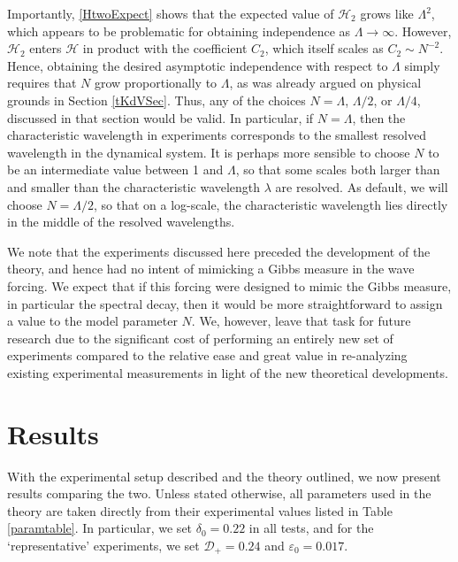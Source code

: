 \documentclass[11pt]{article}
\newcommand{\eps}{\varepsilon}
\newcommand{\lam}{\lambda}
\newcommand{\lamfac}{N}
\newcommand{\drat}{\mathcal{D}}
\newcommand{\dratdn}{\drat_+}
\newcommand{\epsup}{\eps_0}
\newcommand{\delup}{\delta_0}
\newcommand{\Ham}{\mathcal{H}}
\newcommand{\Htwo}{\Ham_{2}}
\begin{document}
	Importantly, \eqref{HtwoExpect} shows that the expected value of $\Htwo$ grows like $\Lambda^2$, which appears to be problematic for obtaining independence as $\Lambda \to \infty$. However, $\Htwo$ enters $\Ham$ in product with the coefficient $C_2$, which itself scales as $C_2 \sim \lamfac^{-2}$. Hence, obtaining the desired asymptotic independence with respect to $\Lambda$ simply requires that $\lamfac$ grow proportionally to $\Lambda$, as was already argued on physical grounds in Section \ref{tKdVSec}. 
Thus, any of the choices $\lamfac = \Lambda$, $\Lambda/2$, or $\Lambda/4$, discussed in that section would be valid. In particular, if $\lamfac = \Lambda$, then the characteristic wavelength in experiments corresponds to the smallest resolved wavelength in the dynamical system. It is perhaps more sensible to choose $\lamfac$ to be an intermediate value between 1 and $\Lambda$, so that some scales both larger than and smaller than the characteristic wavelength $\lam$ are resolved. As default, we will choose $\lamfac = \Lambda/2$, so that on a log-scale, the characteristic wavelength lies directly in the middle of the resolved wavelengths. 

	We note that the experiments discussed here preceded the development of the theory, and hence had no intent of mimicking a Gibbs measure in the wave forcing. We expect that if this forcing were designed to mimic the Gibbs measure, in particular the spectral decay, then it would be more straightforward to assign a value to the model parameter $\lamfac$. We, however, leave that task for future research due to the significant cost of performing an entirely new set of experiments compared to the relative ease and great value in re-analyzing existing experimental measurements in light of the new theoretical developments.

\section{Results}

With the experimental setup described and the theory outlined, we now present results comparing the two. Unless stated otherwise, all parameters used in the theory are taken directly from their experimental values listed in Table \ref{paramtable}. In particular, we set $\delup = 0.22$ in all tests, and for the `representative' experiments, we set $\dratdn = 0.24$ and $\epsup = 0.017$. 
\end{document}
